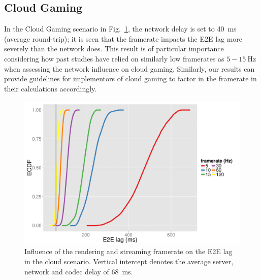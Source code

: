 \subsection{Cloud Gaming}

 In the Cloud Gaming scenario in Fig.~\ref{fig:cloud-e2e-delay-sim}, the network delay is set to \SI{40}{\milli\second} (average round-trip); it is seen that the framerate impacts the \gls{E2E} lag more severely than the network does. This result is of particular importance considering how past studies have relied on similarly low framerates as $5-\SI{15}{\hertz}$ when assessing the network influence on cloud gaming. Similarly, our results can provide guidelines for implementors of cloud gaming to factor in the framerate in their calculations accordingly.


\begin{figure}[!t]
	\centering
	\includegraphics[width=1.0\columnwidth]{../../../simulation/visualization/cloudgaming-lag-cdf.pdf}
	\caption{Influence of the rendering and streaming framerate on the \gls{E2E} lag in the cloud scenario. Vertical intercept denotes the average server, network and codec delay of \SI{68}{\milli\second}.}
\label{fig:cloud-e2e-delay-sim}
\end{figure}

